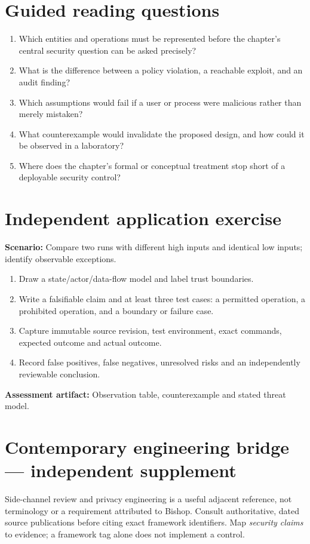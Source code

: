 \documentclass[10pt,letterpaper]{article}
\begin{document}
\section{Guided reading questions}
\begin{enumerate}
\item Which entities and operations must be represented before the chapter's central security question can be asked precisely?
\item What is the difference between a policy violation, a reachable exploit, and an audit finding?
\item Which assumptions would fail if a user or process were malicious rather than merely mistaken?
\item What counterexample would invalidate the proposed design, and how could it be observed in a laboratory?
\item Where does the chapter's formal or conceptual treatment stop short of a deployable security control?
\end{enumerate}
\section{Independent application exercise}
\textbf{Scenario:} Compare two runs with different high inputs and identical low inputs; identify observable exceptions.
\begin{enumerate}
\item Draw a state/actor/data-flow model and label trust boundaries.
\item Write a falsifiable claim and at least three test cases: a permitted operation, a prohibited operation, and a boundary or failure case.
\item Capture immutable source revision, test environment, exact commands, expected outcome and actual outcome.
\item Record false positives, false negatives, unresolved risks and an independently reviewable conclusion.
\end{enumerate}
\textbf{Assessment artifact:} Observation table, counterexample and stated threat model.
\section{Contemporary engineering bridge --- independent supplement}
Side-channel review and privacy engineering is a useful adjacent reference, not terminology or a requirement attributed to Bishop. Consult authoritative, dated source publications before citing exact framework identifiers. Map \emph{security claims} to evidence; a framework tag alone does not implement a control.
\end{document}
